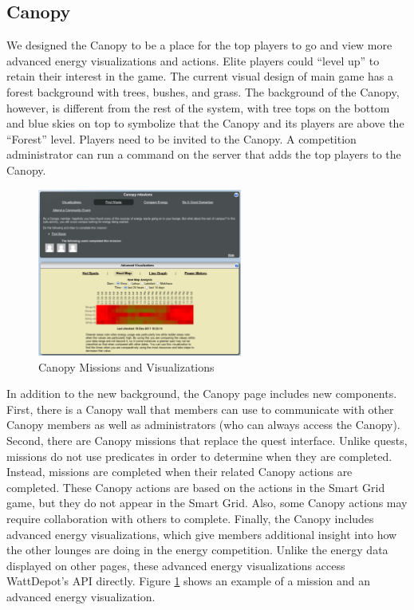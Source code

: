\subsection{Canopy}
\label{makahiki:components-canopy}

We designed the Canopy to be a place for the top players to go and view
more advanced energy visualizations and actions. Elite players could ``level
up'' to retain their interest in the game. The current visual design of
main game has a forest background with trees, bushes, and grass. The
background of the Canopy, however, is different from the rest of the
system, with tree tops on the bottom and blue skies on top to symbolize
that the Canopy and its players are above the ``Forest'' level. Players need to be invited
to the Canopy. A competition administrator can run a command on the server
that adds the top players to the Canopy.

\begin{figure}[ht!]
  \center
  \includegraphics[width=0.6\textwidth]{images/canopy-missions-visualizations.eps}
  \caption{Canopy Missions and Visualizations}
  \label{fig:CanopyMissions}
\end{figure}

In addition to the new background, the Canopy page includes new components. First, there is a Canopy wall that members can use to communicate with other Canopy members as well as administrators (who can always access the Canopy). Second, there are Canopy missions that replace the quest interface. Unlike quests, missions do not use predicates in order to determine when they are completed. Instead, missions are completed when their related Canopy actions are completed. These Canopy actions are based on the actions in the Smart Grid game, but they do not appear in the Smart Grid. Also, some Canopy actions may require collaboration with others to complete. Finally, the Canopy includes advanced energy visualizations, which give members additional insight into how the other lounges are doing in the energy competition. Unlike the energy data displayed on other pages, these advanced energy visualizations access WattDepot's API directly. Figure \ref{fig:CanopyMissions} shows an example of a mission and an advanced energy visualization.

